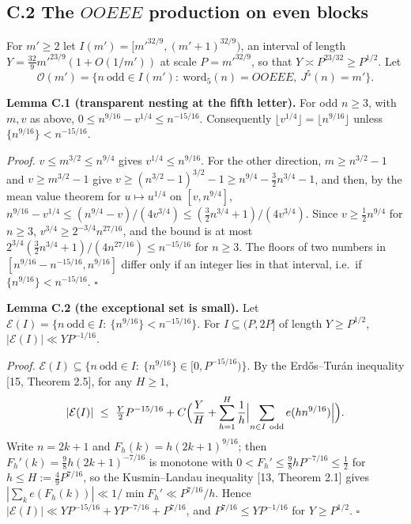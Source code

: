 \documentclass[11pt,a4paper]{article}
\begin{document}
\subsection{\texorpdfstring{C.2 The \(OOEEE\) production on even
blocks}{C.2 The OOEEE production on even blocks}}\label{c.2-the-ooeee-production-on-even-blocks}

For \(m'\ge 2\) let \(I(m')=[m'^{32/9},(m'+1)^{32/9})\), an interval of
length \(Y=\tfrac{32}9m'^{23/9}(1+O(1/m'))\) at scale \(P=m'^{32/9}\),
so that \(Y\asymp P^{23/32}\ge P^{1/2}\). Let \[
\mathcal O(m')=\{n\ \text{odd}\in I(m'):\ \mathrm{word}_5(n)=OOEEE,\ J^5(n)=m'\}.
\]

\textbf{Lemma C.1 (transparent nesting at the fifth letter).} For odd
\(n\ge 3\), with \(m,v\) as above,
\(0\le n^{9/16}-v^{1/4}\le n^{-15/16}\). Consequently
\(\lfloor v^{1/4}\rfloor=\lfloor n^{9/16}\rfloor\) unless
\(\{n^{9/16}\}<n^{-15/16}\).

\emph{Proof.} \(v\le m^{3/2}\le n^{9/4}\) gives \(v^{1/4}\le n^{9/16}\).
For the other direction, \(m\ge n^{3/2}-1\) and \(v\ge m^{3/2}-1\) give
\(v\ge(n^{3/2}-1)^{3/2}-1\ge n^{9/4}-\tfrac32n^{3/4}-1\), and then, by
the mean value theorem for \(u\mapsto u^{1/4}\) on \([v,n^{9/4}]\),
\(n^{9/16}-v^{1/4}\le(n^{9/4}-v)/(4v^{3/4})\le(\tfrac32n^{3/4}+1)/(4v^{3/4})\).
Since \(v\ge\tfrac12n^{9/4}\) for \(n\ge 3\),
\(v^{3/4}\ge 2^{-3/4}n^{27/16}\), and the bound is at most
\(2^{3/4}(\tfrac32n^{3/4}+1)/(4n^{27/16})\le n^{-15/16}\) for
\(n\ge 3\). The floors of two numbers in
\([n^{9/16}-n^{-15/16},n^{9/16}]\) differ only if an integer lies in
that interval, i.e.~if \(\{n^{9/16}\}<n^{-15/16}\). \(\square\)

\textbf{Lemma C.2 (the exceptional set is small).} Let
\(\mathcal E(I)=\{n\ \text{odd}\in I:\ \{n^{9/16}\}<n^{-15/16}\}\). For
\(I\subseteq(P,2P]\) of length \(Y\ge P^{1/2}\),
\(|\mathcal E(I)|\ll YP^{-1/16}\).

\emph{Proof.}
\(\mathcal E(I)\subseteq\{n\ \text{odd}\in I:\ \{n^{9/16}\}\in[0,P^{-15/16})\}\).
By the Erd\H{o}s--Tur\'{a}n inequality {[}15, Theorem 2.5{]}, for any
\(H\ge 1\), \[
|\mathcal E(I)|\ \le\ \tfrac Y2P^{-15/16}+C\Bigl(\frac YH+\sum_{h=1}^{H}\frac1h\Bigl|\sum_{n\in I\ \mathrm{odd}}e(hn^{9/16})\Bigr|\Bigr).
\] Write \(n=2k+1\) and \(F_h(k)=h(2k+1)^{9/16}\); then
\(F_h'(k)=\tfrac98h(2k+1)^{-7/16}\) is monotone with
\(0<F_h'\le\tfrac98hP^{-7/16}\le\tfrac12\) for
\(h\le H:=\tfrac49P^{7/16}\), so the Kusmin--Landau inequality {[}13,
Theorem 2.1{]} gives \(|\sum_ke(F_h(k))|\ll 1/\min F_h'\ll P^{7/16}/h\).
Hence \(|\mathcal E(I)|\ll YP^{-15/16}+YP^{-7/16}+P^{7/16}\), and
\(P^{7/16}\le YP^{-1/16}\) for \(Y\ge P^{1/2}\). \(\square\)
\end{document}
